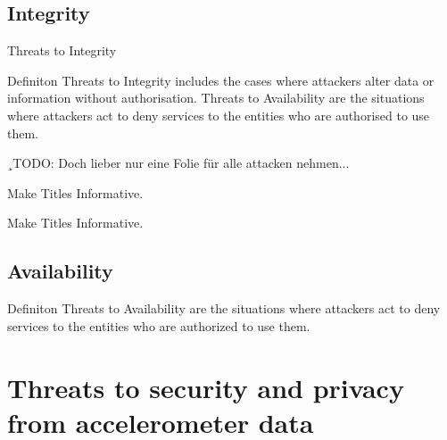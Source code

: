\documentclass[ucs,9pt]{beamer}
\begin{document}
\subsection{Integrity}


\begin{frame}{Threats to Integrity}
		\begin{alertblock}{Definiton}
			Threats to Integrity includes the cases  where attackers alter data or information without authorisation.  Threats to Availability are the situations where attackers act  to deny services to the entities who are authorised to use them.
		\end{alertblock}
	
\end{frame}

¸TODO: Doch lieber nur eine Folie für alle attacken nehmen...

\begin{frame}{Make Titles Informative.}
\end{frame}

\begin{frame}{Make Titles Informative.}
\end{frame}



\subsection{Availability}

\begin{frame}

\begin{alertblock}{Definiton}
 Threats to Availability are the situations where attackers act  to deny services to the entities who are authorized to use them.
\end{alertblock}
\end{frame}


\section{Threats to security and privacy from accelerometer data}
\end{document}
